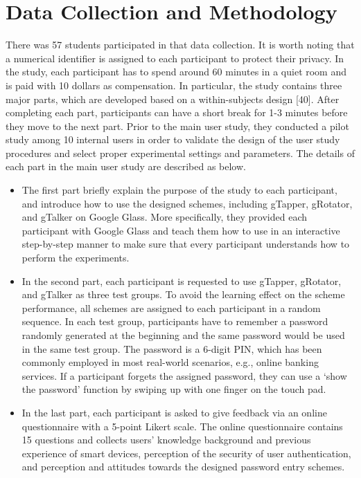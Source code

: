 \documentclass[12pt,a4paper,oneside]{report}
\begin{document}
\section{Data Collection and Methodology}
There was 57 students participated in that data collection.  It is worth noting that a
numerical identifier is assigned to each participant to protect
their privacy. In the study, each participant has to spend around
60 minutes in a quiet room and is paid with 10 dollars as compensation. In particular, the study contains three major parts,
which are developed based on a within-subjects design [40].
After completing each part, participants can have a short break
for 1-3 minutes before they move to the next part. Prior
to the main user study, they conducted a pilot study among
10 internal users in order to validate the design of the user
study procedures and select proper experimental settings and
parameters. The details of each part in the main user study are
described as below.
\begin{itemize}
    \item  The first part briefly explain the purpose of the
study to each participant, and introduce how to use
the designed schemes, including gTapper, gRotator, and
gTalker on Google Glass. More specifically, they provided
each participant with Google Glass and teach them how
to use in an interactive step-by-step manner to make sure
that every participant understands how to perform the
experiments.
\item In the second part, each participant is requested to use
gTapper, gRotator, and gTalker as three test groups.
To avoid the learning effect on the scheme performance,
all schemes are assigned to each participant in a random
sequence. In each test group, participants have to remember a password randomly generated at the beginning
and the same password would be used in the same
test group. The password is a 6-digit PIN, which has
been commonly employed in most real-world scenarios,
e.g., online banking services. If a participant forgets the
assigned password, they can use a ‘show the password’
function by swiping up with one finger on the touch pad.
\item In the last part, each participant is asked to give feedback via an online questionnaire with a 5-point Likert
scale. The online questionnaire contains 15 questions
and collects users’ knowledge background and previous
experience of smart devices, perception of the security of
user authentication, and perception and attitudes towards
the designed password entry schemes.

\end{itemize}
\end{document}
